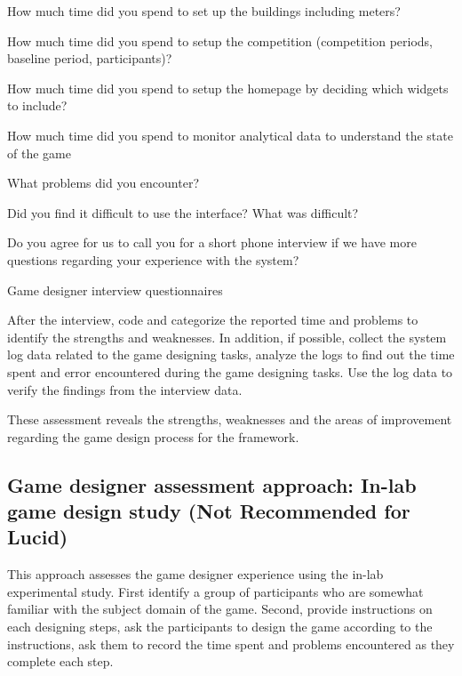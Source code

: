 \documentclass[11pt,oneside]{book}
\begin{document}
\begin{table}[ht!]
\begin{mybox}
\begin{compactenum}
\item How much time did you spend to set up the buildings including meters?
\item How much time did you spend to setup the competition (competition periods, baseline period, participants)?
\item How much time did you spend to setup the homepage by deciding which widgets to include?
\item How much time did you spend to monitor analytical data to understand the state of the game
\item What problems did you encounter?
\item Did you find it difficult to use the interface? What was difficult?
\item Do you agree for us to call you for a short phone interview if we have more questions regarding your experience with the system?
\end{compactenum}
\end{mybox}
\caption{Game designer interview questionnaires}
\label{fig:game-designer-interview}  
\end{table}

After the interview, code and categorize the reported time and problems to identify the strengths and weaknesses. In addition, if possible, collect the system log data related to the game designing tasks, analyze the logs to find out the time spent and error encountered during the game designing tasks. Use the log data to verify the findings from the interview data.

These assessment reveals the strengths, weaknesses and the areas of improvement regarding the game design process for the framework.

\subsection{Game designer assessment approach: In-lab game design study (Not Recommended for Lucid)}
\label{In-lab game design study}

This approach assesses the game designer experience using the in-lab experimental study.  First identify a group 
of participants who are somewhat familiar with the subject domain of the game. Second, provide instructions on 
each designing steps, ask the participants to design the game according to the instructions, ask them to record 
the time spent and problems encountered as they complete each step.
\end{document}
